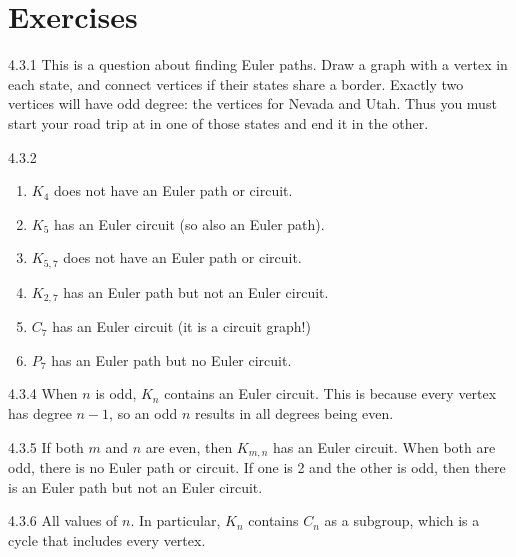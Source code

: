 \documentclass[11pt,]{book}
\theoremstyle{ptxplainnotitle}
\theoremstyle{ptxplaintitle}
\theoremstyle{ptxdefinitionnotitle}
\theoremstyle{ptxdefinitiontitle}
\theoremstyle{ptxdefinitionnotitle}
\theoremstyle{ptxdefinitiontitle}
\theoremstyle{ptxdefinitionnotitle}
\theoremstyle{ptxdefinitiontitle}
\theoremstyle{ptxdefinitiontitlenonumber}
\theoremstyle{ptxdefinitiontitlenonumber}
\numberwithin{equation}{chapter}
\begin{document}
\section*{Exercises}
\begin{divisionexercise}{4.3.1}
\textbf{}\hypertarget{p-2667}{}%
This is a question about finding Euler paths. Draw a graph with a vertex in each state, and connect vertices if their states share a border. Exactly two vertices will have odd degree: the vertices for Nevada and Utah. Thus you must start your road trip at in one of those states and end it in the other.%
\end{divisionexercise}%
\begin{divisionexercise}{4.3.2}
\textbf{}\hypertarget{p-2669}{}%
\leavevmode%
\begin{enumerate}[label=(\alph*)]
\item\hypertarget{li-1221}{}\(K_4\) does not have an Euler path or circuit.%
\item\hypertarget{li-1222}{}\(K_5\) has an Euler circuit (so also an Euler path).%
\item\hypertarget{li-1223}{}\(K_{5,7}\) does not have an Euler path or circuit.%
\item\hypertarget{li-1224}{}\(K_{2,7}\) has an Euler path but not an Euler circuit.%
\item\hypertarget{li-1225}{}\(C_7\) has an Euler circuit (it is a circuit graph!)%
\item\hypertarget{li-1226}{}\(P_7\) has an Euler path but no Euler circuit.%
\end{enumerate}
%
\end{divisionexercise}%
\begin{divisionexercise}{4.3.4}
\textbf{}\hypertarget{p-2676}{}%
When \(n\) is odd, \(K_n\) contains an Euler circuit. This is because every vertex has degree \(n-1\), so an odd \(n\) results in all degrees being even.%
\end{divisionexercise}%
\begin{divisionexercise}{4.3.5}
\textbf{}\hypertarget{p-2678}{}%
If both \(m\) and \(n\) are even, then \(K_{m,n}\) has an Euler circuit. When both are odd, there is no Euler path or circuit. If one is 2 and the other is odd, then there is an Euler path but not an Euler circuit.%
\end{divisionexercise}%
\begin{divisionexercise}{4.3.6}
\textbf{}\hypertarget{p-2680}{}%
All values of \(n\). In particular, \(K_n\) contains \(C_n\) as a subgroup, which is a cycle that includes every vertex.%
\end{divisionexercise}%
\end{document}
